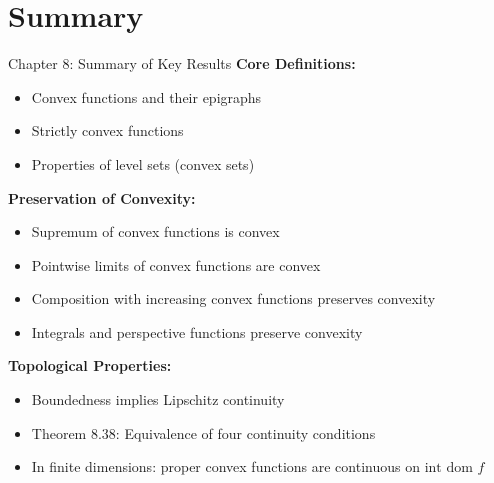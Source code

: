 \documentclass[aspectratio=169,10pt]{beamer}
\begin{document}

\section{Summary}

\begin{frame}{Chapter 8: Summary of Key Results}
    \textbf{Core Definitions:}
    \begin{itemize}
        \item Convex functions and their epigraphs
        \item Strictly convex functions
        \item Properties of level sets (convex sets)
    \end{itemize}

    \vspace{0.2cm}

    \textbf{Preservation of Convexity:}
    \begin{itemize}
        \item Supremum of convex functions is convex
        \item Pointwise limits of convex functions are convex
        \item Composition with increasing convex functions preserves convexity
        \item Integrals and perspective functions preserve convexity
    \end{itemize}

    \vspace{0.2cm}

    \textbf{Topological Properties:}
    \begin{itemize}
        \item Boundedness implies Lipschitz continuity
        \item Theorem 8.38: Equivalence of four continuity conditions
        \item In finite dimensions: proper convex functions are continuous on $\text{int dom } f$
    \end{itemize}
\end{frame}
\end{document}
